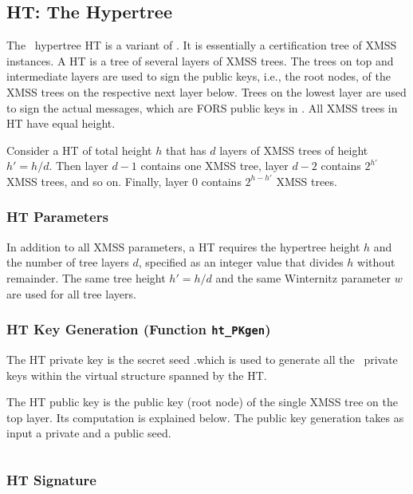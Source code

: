 \subsection{HT: The Hypertree}

The \SPHINCSA\ hypertree HT is a variant of \XMSSMT. It is essentially a certification tree of XMSS instances. A HT is a tree of several layers of XMSS trees. The trees on top and intermediate layers are used to sign the public keys, i.e., the root nodes, of the XMSS trees on the respective next layer below. Trees on the lowest layer are used to sign the actual messages, which are FORS public keys in \SPHINCSA. All XMSS trees in HT have equal height.

Consider a HT of total height $h$ that has $d$ layers of XMSS trees of height $h'=h/d$. Then layer $d-1$ contains one XMSS tree, layer $d-2$ contains $2^{h'}$ XMSS trees, and so on. Finally, layer $0$ contains $2^{h-h'}$ XMSS trees.

\subsubsection{HT Parameters}
\label{sec:htpara}
In addition to all XMSS parameters, a HT requires the hypertree height $h$ and the number of tree layers $d$, specified as an integer value that divides $h$ without remainder. The same tree height $h'=h/d$ and the same Winternitz parameter $w$ are used for all tree layers.


\subsubsection{HT Key Generation (Function \texttt{ht\_PKgen})}

The HT private key is the secret seed \sk.\seed which is used to generate all the \WOTSCS\ private keys within the virtual structure spanned by the HT.

The HT public key is the public key (root node) of the single XMSS tree on the top layer. Its computation is explained below. The public key generation takes as input a private and a public seed.

\begin{algorithm}
\inputminted[breaklines,linenos,tabsize=2,mathescape,escapeinside=||]{C}{paper/code/ht_PKgen.cs}
\caption{\texttt{ht\_PKgen} --- Generating an HT public key.}
\label{alg:htpkgen}
\end{algorithm}
\subsubsection{HT Signature}

